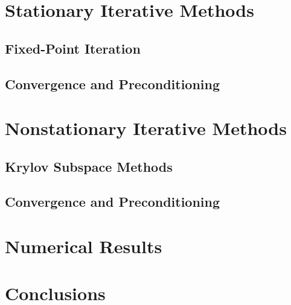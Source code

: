 \documentclass[10pt]{article}
\begin{document}
\section{Stationary Iterative Methods}
\subsection{Fixed-Point Iteration}
\subsection{Convergence and Preconditioning}

\section{Nonstationary Iterative Methods}
\subsection{Krylov Subspace Methods}
\subsection{Convergence and Preconditioning}

\section{Numerical Results}

\section{Conclusions}

\end{document}

